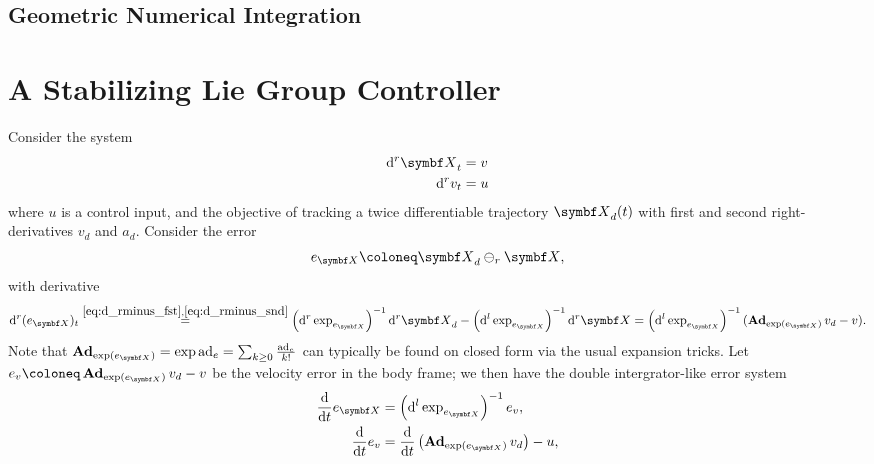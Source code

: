 
\subsection{Geometric Numerical Integration}




\section{A Stabilizing Lie Group Controller}

Consider the system
\begin{equation}
  \begin{aligned}
    \mathrm{d}^r \X_t & = v \\
    \mathrm{d}^r v_t  & = u
  \end{aligned}
\end{equation}
where $u$ is a control input, and the objective of tracking a twice differentiable trajectory $\X_d(t)$ with first and second right-derivatives $v_d$ and $a_d$. Consider the error
\begin{equation}
  e_\X \coloneq \X_d \ominus_r \X,
\end{equation}
with derivative
\begin{equation}
  \mathrm{d}^r (e_\X)_t \overset{\eqref{eq:d_rminus_fst},\eqref{eq:d_rminus_snd}}= \left(\mathrm{d}^r \exp_{e_\X} \right)^{-1} \mathrm{d}^r \X_d - \left(\mathrm{d}^l \exp_{e_\X} \right)^{-1} \mathrm{d}^r \X = \left(\mathrm{d}^l \exp_{e_\X} \right)^{-1} (\bAd_{\exp(e_\X)} v_d - v).
\end{equation}
Note that $\bAd_{\exp(e_\X)} = \exp \ad_{e} = \sum_{k \geq 0} \frac{\ad_e}{k!}$ can typically be found on closed form via the usual expansion tricks. Let $e_v \coloneq \bAd_{\exp(e_\X)} v_d - v$ be the velocity error in the body frame; we then have the double intergrator-like error system
\begin{equation}
  \begin{aligned}
    \frac{\mathrm{d}}{\mathrm{d}t} e_\X & = \left(\mathrm{d}^l \exp_{e_\X} \right)^{-1} e_v,                        \\
    \frac{\mathrm{d}}{\mathrm{d}t} e_v  & = \frac{\mathrm{d}}{\mathrm{d}t} \left( \bAd_{\exp(e_\X)} v_d\right) - u,
  \end{aligned}
\end{equation}
